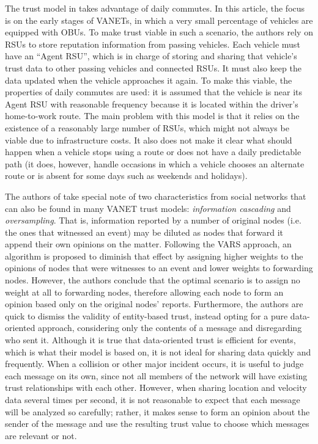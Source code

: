 The trust model in \citep{park2011long} takes advantage of daily commutes.
In this article, the focus is on the early stages of VANETs, in which a very small percentage of vehicles are equipped with OBUs.
To make trust viable in such a scenario, the authors rely on RSUs to store reputation information from passing vehicles.
Each vehicle must have an ``Agent RSU'', which is in charge of storing and sharing that vehicle's trust data to other passing vehicles and connected RSUs.
It must also keep the data updated when the vehicle approaches it again.
To make this viable, the properties of daily commutes are used: it is assumed that the vehicle is near its Agent RSU with reasonable frequency because it is located within the driver's home-to-work route.
The main problem with this model is that it relies on the existence of a reasonably large number of RSUs, which might not always be viable due to infrastructure costs.
It also does not make it clear what should happen when a vehicle stops using a route or does not have a daily predictable path (it does, however, handle occasions in which a vehicle chooses an alternate route or is absent for some days such as weekends and holidays).

The authors of \citep{huang2014social} take special note of two characteristics from social networks that can also be found in many VANET trust models: \textit{information cascading} and \textit{oversampling}.
That is, information reported by a number of original nodes (i.e. the ones that witnessed an event) may be diluted as nodes that forward it append their own opinions on the matter.
Following the VARS \citep{dotzer2005vars} approach, an algorithm is proposed to diminish that effect by assigning higher weights to the opinions of nodes that were witnesses to an event and lower weights to forwarding nodes.
However, the authors conclude that the optimal scenario is to assign no weight at all to forwarding nodes, therefore allowing each node to form an opinion based only on the original nodes' reports.
Furthermore, the authors are quick to dismiss the validity of entity-based trust, instead opting for a pure data-oriented approach, considering only the contents of a message and disregarding who sent it.
Although it is true that data-oriented trust is efficient for events, which is what their model is based on, it is not ideal for sharing data quickly and frequently.
When a collision or other major incident occurs, it is useful to judge each message on its own, since not all members of the network will have existing trust relationships with each other.
However, when sharing location and velocity data several times per second, it is not reasonable to expect that each message will be analyzed so carefully; rather, it makes sense to form an opinion about the sender of the message and use the resulting trust value to choose which messages are relevant or not.

